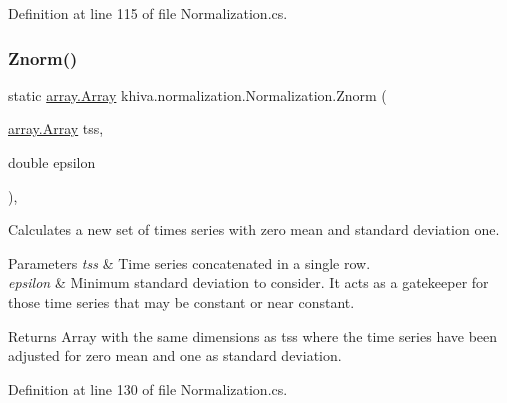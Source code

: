 Definition at line 115 of file Normalization.\+cs.

\mbox{\label{classkhiva_1_1normalization_1_1_normalization_a20d08a7e62353599b85bb223ee2b07bc}} 
\subsubsection{\texorpdfstring{Znorm()}{Znorm()}\hspace{0.1cm}{\footnotesize\ttfamily [1/2]}}
{\footnotesize\ttfamily static \mbox{\hyperlink{classkhiva_1_1array_1_1_array}{array.\+Array}} khiva.\+normalization.\+Normalization.\+Znorm (\begin{DoxyParamCaption}\item[{\mbox{\hyperlink{classkhiva_1_1array_1_1_array}{array.\+Array}}}]{tss,  }\item[{double}]{epsilon }\end{DoxyParamCaption})\hspace{0.3cm}{\ttfamily [inline]}, {\ttfamily [static]}}



Calculates a new set of times series with zero mean and standard deviation one. 


\begin{DoxyParams}{Parameters}
{\em tss} & Time series concatenated in a single row.\\
\hline
{\em epsilon} & Minimum standard deviation to consider. It acts as a gatekeeper for those time series that may be constant or near constant.\\
\hline
\end{DoxyParams}
\begin{DoxyReturn}{Returns}
Array with the same dimensions as tss where the time series have been adjusted for zero mean and one as standard deviation.
\end{DoxyReturn}


Definition at line 130 of file Normalization.\+cs.

\mbox{\label{classkhiva_1_1normalization_1_1_normalization_a708ca228ebe1822c77eabf8a78338747}} 
